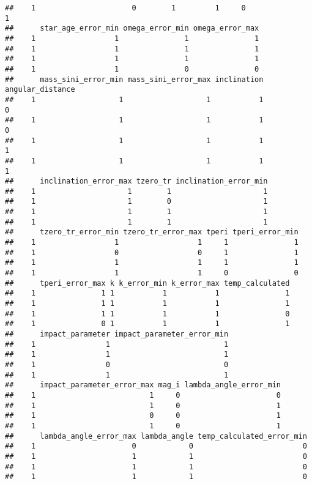 \documentclass[]{article}
\begin{document}
\begin{verbatim}
##    1                      0        1         1     0                  1
##      star_age_error_min omega_error_min omega_error_max
##    1                  1               1               1
##    1                  1               1               1
##    1                  1               1               1
##    1                  1               0               0
##      mass_sini_error_min mass_sini_error_max inclination angular_distance
##    1                   1                   1           1                0
##    1                   1                   1           1                0
##    1                   1                   1           1                1
##    1                   1                   1           1                1
##      inclination_error_max tzero_tr inclination_error_min
##    1                     1        1                     1
##    1                     1        0                     1
##    1                     1        1                     1
##    1                     1        1                     1
##      tzero_tr_error_min tzero_tr_error_max tperi tperi_error_min
##    1                  1                  1     1               1
##    1                  0                  0     1               1
##    1                  1                  1     1               1
##    1                  1                  1     0               0
##      tperi_error_max k k_error_min k_error_max temp_calculated
##    1               1 1           1           1               1
##    1               1 1           1           1               1
##    1               1 1           1           1               0
##    1               0 1           1           1               1
##      impact_parameter impact_parameter_error_min
##    1                1                          1
##    1                1                          1
##    1                0                          0
##    1                1                          1
##      impact_parameter_error_max mag_i lambda_angle_error_min
##    1                          1     0                      0
##    1                          1     0                      1
##    1                          0     0                      1
##    1                          1     0                      1
##      lambda_angle_error_max lambda_angle temp_calculated_error_min
##    1                      0            0                         0
##    1                      1            1                         0
##    1                      1            1                         0
##    1                      1            1                         0

\end{verbatim}
\end{document}
